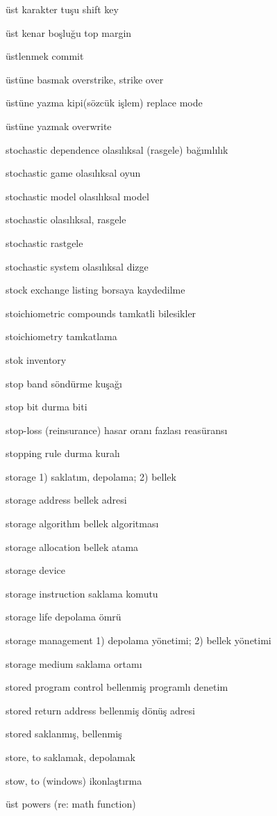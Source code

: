 \documentclass[12pt,fleqn]{article}\usepackage{../../common}
\begin{document}
üst karakter tuşu shift key

üst kenar boşluğu top margin

üstlenmek commit

üstüne basmak overstrike, strike over

üstüne yazma kipi(sözcük işlem) replace mode

üstüne yazmak overwrite

stochastic dependence olasılıksal (rasgele) bağımlılık

stochastic game olasılıksal oyun

stochastic model olasılıksal model

stochastic olasılıksal, rasgele

stochastic rastgele

stochastic system olasılıksal dizge

stock exchange listing borsaya kaydedilme

stoichiometric compounds tamkatli bilesikler

stoichiometry tamkatlama

stok inventory

stop band söndürme kuşağı

stop bit durma biti

stop-loss (reinsurance) hasar oranı fazlası reasüransı

stopping rule durma kuralı

storage 1) saklatım, depolama; 2) bellek

storage address bellek adresi

storage algorithm bellek algoritması

storage allocation bellek atama

storage device

storage instruction saklama komutu

storage life depolama ömrü

storage management 1) depolama yönetimi; 2) bellek yönetimi

storage medium saklama ortamı

stored program control bellenmiş programlı denetim

stored return address bellenmiş dönüş adresi

stored saklanmış, bellenmiş

store, to saklamak, depolamak

stow, to (windows) ikonlaştırma

üst powers (re: math function)
\end{document}
